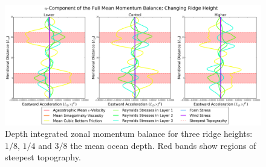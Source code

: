 \documentclass[12pt,a4paper]{report}
\newcommand*\figref[1]{Figure~\ref{#1}}
\begin{document}
%  
%  
%  
%  
%  
  
  
  \begin{figure}
  	\centering
  	\includegraphics[width=\linewidth]{umom_2_4}
  	\caption{ Depth integrated zonal momentum balance for three ridge heights: 
  		$1/8$, $1/4$ and $3/8$ the mean ocean depth. Red bands show regions of steepest topography.}
  	\label{fig:umombalanceheight}
  \end{figure}
  
\end{document}
